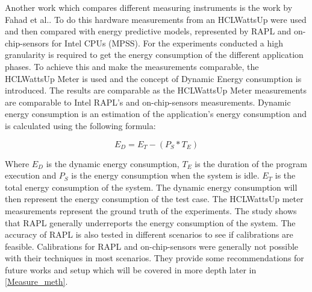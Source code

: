 Another work which compares different measuring instruments is the work by Fahad et al.\cite{fahad2019comparative}. To do this hardware measurements from an HCLWattsUp were used and then compared with energy predictive models, represented by RAPL and on-chip-sensors for Intel CPUs (MPSS). For the experiments conducted a high granularity is required to get the energy consumption of the different application phases. To achieve this and make the measurements comparable, the HCLWattsUp Meter is used and the concept of Dynamic Energy consumption is introduced. The results are comparable as the HCLWattsUp Meter measurements are comparable to Intel RAPL's and on-chip-sensors measurements. Dynamic energy consumption is an estimation of the application's energy consumption and is calculated using the following formula:\cite{fahad2019comparative}

\begin{equation}
    E_D = E_T - (P_S * T_E)
\end{equation}

Where $E_D$ is the dynamic energy consumption, $T_E$ is the duration of the program execution and $P_S$ is the energy consumption when the system is idle. $E_T$ is the total energy consumption of the system. The dynamic energy consumption will then represent the energy consumption of the test case. The HCLWattsUp meter measurements represent the ground truth of the experiments. The study shows that RAPL generally underreports the energy consumption of the system. The accuracy of RAPL is also tested in different scenarios to see if calibrations are feasible. Calibrations for RAPL and on-chip-sensors were generally not possible with their techniques in most scenarios. They provide some recommendations for future works and setup which will be covered in more depth later in \ref{Measure_meth}.